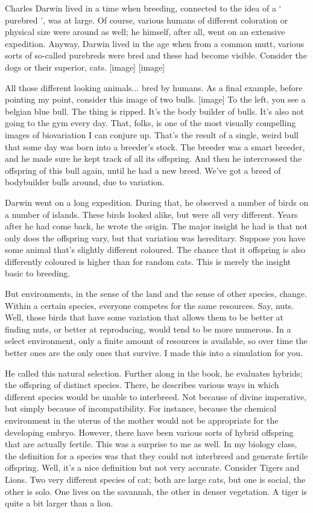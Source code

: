 \begin{multicols}{2}
Charles Darwin lived in a time when breeding, connected to the idea of a ‘ purebred ’, was at large. Of course, various humans of different coloration or physical size were around as well; he himself, after all, went on an extensive expedition. Anyway, Darwin lived in the age when from a common mutt, various sorts of so-called purebreds were bred and these had become visible. Consider the dogs or their superior, cats. [image] [image]

All those different looking animals... bred by humans. As a final example, before pointing my point, consider this image of two bulls. [image] To the left, you see a belgian blue bull. The thing is ripped. It's the body builder of bulls. It's also not going to the gym every day. That, folks, is one of the most visually compelling images of biovariation I can conjure up. That's the result of a single, weird bull that some day was born into a breeder's stock. The breeder was a smart breeder, and he made sure he kept track of all its offspring. And then he intercrossed the offspring of this bull again, until he had a new breed. We've got a breed of bodybuilder bulls around, due to variation.

Darwin went on a long expedition. During that, he observed a number of birds on a number of islands. These birds looked alike, but were all very different. Years after he had come back, he wrote the origin. The major insight he had is that not only does the offspring vary, but that variation was hereditary. Suppose you have some animal that's slightly different coloured. The chance that it offspring is also differently coloured is higher than for random cats. This is merely the insight basic to breeding.

But environments, in the sense of the land and the sense of other species, change. Within a certain species, everyone competes for the same resources. Say, nuts. Well, those birds that have some variation that allows them to be better at finding nuts, or better at reproducing, would tend to be more numerous. In a select environment, only a finite amount of resources is available, so over time the better ones are the only ones that survive. I made this into a simulation for you.

He called this natural selection. Further along in the book, he evaluates hybrids; the offspring of distinct species. There, he describes various ways in which different species would be unable to interbreed. Not because of divine imperative, but simply because of incompatibility. For instance, because the chemical environment in the uterus of the mother would not be appropriate for the developing embryo. However, there have been various sorts of hybrid offspring that are actually fertile. This was a surprise to me as well. In my biology class, the definition for a species was that they could not interbreed and generate fertile offspring. Well, it's a nice definition but not very accurate. Consider Tigers and Lions. Two very different species of cat; both are large cats, but one is social, the other is solo. One lives on the savannah, the other in denser vegetation. A tiger is quite a bit larger than a lion.


\end{multicols}
